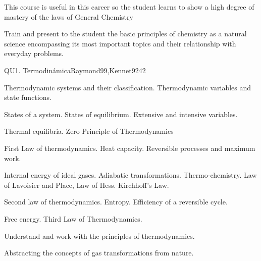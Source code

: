 \begin{syllabus}

\begin{justification}
This course is useful in this career so the student learns to show a high degree of mastery of the laws of General Chemistry

\end{justification}

\begin{goals}

\item Train and present to the student the basic principles of chemistry as a natural science encompassing its most important topics and their relationship with everyday problems.

\end{goals}

\begin{outcomes}
\end{outcomes}

\begin{unit}{}{QU1. Termodinámica}{Raymond99,Kennet92}{4}{2}
\begin{topics}
     
      \item Thermodynamic systems and their classification. Thermodynamic variables and state functions.
      \item States of a system. States of equilibrium. Extensive and intensive variables.
      \item Thermal equilibria. Zero Principle of Thermodynamics
      \item First Law of thermodynamics. Heat capacity. Reversible processes and maximum work.
      \item Internal energy of ideal gases. Adiabatic transformations. Thermo-chemistry. Law of Lavoisier and Place, Law of Hess. Kirchhoff's Law.
      \item Second law of thermodynamics. Entropy. Efficiency of a reversible cycle.
      \item Free energy. Third Law of Thermodynamics.
\end{topics}

   \begin{learningoutcomes}
      \item Understand and work with the principles of thermodynamics.
      \item Abstracting the concepts of gas transformations from nature.
   \end{learningoutcomes}
\end{unit}


\end{syllabus}
